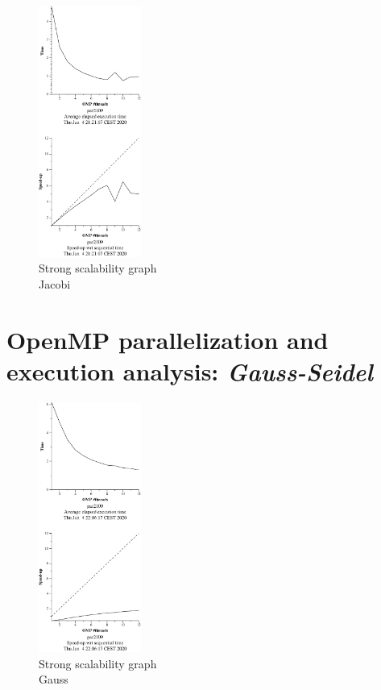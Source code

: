 \begin{figure}[H]
    \centering
    \includegraphics[width=0.3\textwidth]{heat-omp-strong-jacobi-crop}
    \caption{Strong scalability graph \\ Jacobi}%
    \label{fig:strong-jacobi}
\end{figure}



\pagebreak
\section{OpenMP parallelization and execution analysis: \emph{Gauss-Seidel}}




\begin{figure}[H]
    \centering
    \includegraphics[width=0.3\textwidth]{heat-omp-strong-gauss-crop}
    \caption{Strong scalability graph \\ Gauss}%
    \label{fig:strong-gauss}
\end{figure}

